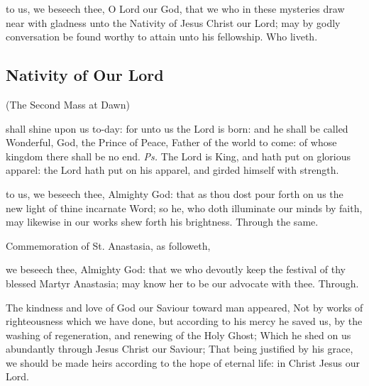 \postcommunion
{} to us, we beseech thee, O Lord our God, that we who in these mysteries draw near with gladness unto the Nativity of Jesus Christ our Lord; may by godly conversation be found worthy to attain unto his fellowship. Who liveth.

\clearpage
\subsection{Nativity of Our Lord}

\begin{inhead}
	(The Second Mass at Dawn)
\end{inhead}


\introit
{} shall shine upon us to-day: for unto us the Lord is born: and he shall be called Wonderful, God, the Prince of Peace, Father of the world to come: of whose kingdom there shall be no end. \textit{Ps.} The Lord is King, and hath put on glorious apparel: the Lord hath put on his apparel, and girded himself with strength.

\collect
{} to us, we beseech thee, Almighty God: that as thou dost pour forth on us the new light of thine incarnate Word; so he, who doth illuminate our minds by faith, may likewise in our works shew forth his brightness. Through the same.
\begin{rubric}
	Commemoration of St. Anastasia, as followeth,
\end{rubric}
 we beseech thee, Almighty God: that we who devoutly keep the festival of thy blessed Martyr Anastasia; may know her to be our advocate with thee. Through.

 The kindness and love of God our Saviour toward man appeared, Not by works of righteousness which we have done, but according to his mercy he saved us, by the washing of regeneration, and renewing of the Holy Ghost; Which he shed on us abundantly through Jesus Christ our Saviour; That being justified by his grace, we should be made heirs according to the hope of eternal life: in Christ Jesus our Lord.


